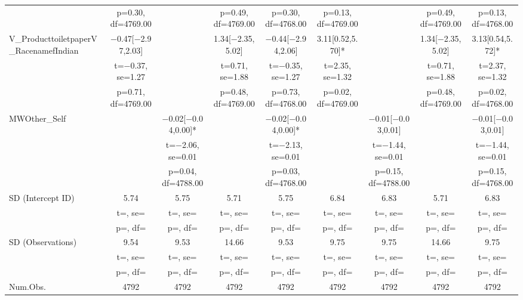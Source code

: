 \documentclass[]{report}
\begin{document}
\begin{table}
{\begin{tabular}[t]{lcccccccc}
		& p=\num{0.30}, df=\num{4769.00} &  & p=\num{0.49}, df=\num{4769.00} & p=\num{0.30}, df=\num{4768.00} & p=\num{0.13}, df=\num{4769.00} &  & p=\num{0.49}, df=\num{4769.00} & p=\num{0.13}, df=\num{4768.00}\\
		V\_ProducttoiletpaperV\_RacenamefIndian & \num{-0.47}[\num{-2.97},\num{2.03}] &  & \num{1.34}[\num{-2.35},\num{5.02}] & \num{-0.44}[\num{-2.94},\num{2.06}] & \num{3.11}[\num{0.52},\num{5.70}]* &  & \num{1.34}[\num{-2.35},\num{5.02}] & \num{3.13}[\num{0.54},\num{5.72}]*\\
		& t=\num{-0.37}, se=\num{1.27} &  & t=\num{0.71}, se=\num{1.88} & t=\num{-0.35}, se=\num{1.27} & t=\num{2.35}, se=\num{1.32} &  & t=\num{0.71}, se=\num{1.88} & t=\num{2.37}, se=\num{1.32}\\
		& p=\num{0.71}, df=\num{4769.00} &  & p=\num{0.48}, df=\num{4769.00} & p=\num{0.73}, df=\num{4768.00} & p=\num{0.02}, df=\num{4769.00} &  & p=\num{0.48}, df=\num{4769.00} & p=\num{0.02}, df=\num{4768.00}\\
		MWOther\_Self &  & \num{-0.02}[\num{-0.04},\num{0.00}]* &  & \num{-0.02}[\num{-0.04},\num{0.00}]* &  & \num{-0.01}[\num{-0.03},\num{0.01}] &  & \num{-0.01}[\num{-0.03},\num{0.01}]\\
		&  & t=\num{-2.06}, se=\num{0.01} &  & t=\num{-2.13}, se=\num{0.01} &  & t=\num{-1.44}, se=\num{0.01} &  & t=\num{-1.44}, se=\num{0.01}\\
		&  & p=\num{0.04}, df=\num{4788.00} &  & p=\num{0.03}, df=\num{4768.00} &  & p=\num{0.15}, df=\num{4788.00} &  & p=\num{0.15}, df=\num{4768.00}\\
		SD (Intercept ID) & \num{5.74} & \num{5.75} & \num{5.71} & \num{5.75} & \num{6.84} & \num{6.83} & \num{5.71} & \num{6.83}\\
		& t=, se= & t=, se= & t=, se= & t=, se= & t=, se= & t=, se= & t=, se= & t=, \vphantom{1} se=\\
		& p=, df= & p=, df= & p=, df= & p=, df= & p=, df= & p=, df= & p=, df= & p=, \vphantom{1} df=\\
		SD (Observations) & \num{9.54} & \num{9.53} & \num{14.66} & \num{9.53} & \num{9.75} & \num{9.75} & \num{14.66} & \num{9.75}\\
		& t=, se= & t=, se= & t=, se= & t=, se= & t=, se= & t=, se= & t=, se= & t=, se=\\
		& p=, df= & p=, df= & p=, df= & p=, df= & p=, df= & p=, df= & p=, df= & p=, df=\\
		\midrule
		Num.Obs. & \num{4792} & \num{4792} & \num{4792} & \num{4792} & \num{4792} & \num{4792} & \num{4792} & \num{4792}\\

\end{tabular}}
\end{table}
\end{document}
